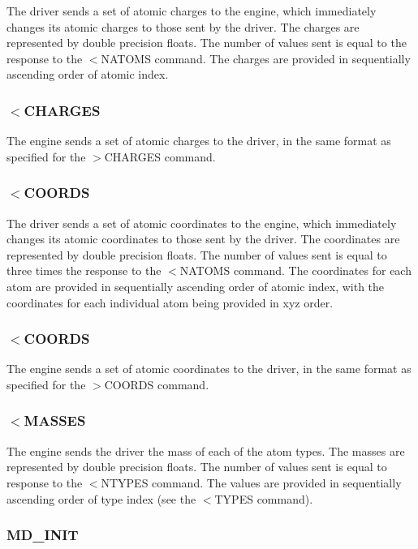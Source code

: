 The driver sends a set of atomic charges to the engine, which immediately changes its atomic charges to those sent by the driver. The charges are represented by double precision floats. The number of values sent is equal to the response to the $<$N\-A\-T\-O\-M\-S command. The charges are provided in sequentially ascending order of atomic index.\hypertarget{index_recv_charges}{}\subsubsection{$<$\-C\-H\-A\-R\-G\-E\-S}\label{index_recv_charges}
The engine sends a set of atomic charges to the driver, in the same format as specified for the {\ttfamily $>$C\-H\-A\-R\-G\-E\-S} command.\hypertarget{index_send_coords}{}\subsubsection{$<$\-C\-O\-O\-R\-D\-S}\label{index_send_coords}
The driver sends a set of atomic coordinates to the engine, which immediately changes its atomic coordinates to those sent by the driver. The coordinates are represented by double precision floats. The number of values sent is equal to three times the response to the $<$N\-A\-T\-O\-M\-S command. The coordinates for each atom are provided in sequentially ascending order of atomic index, with the coordinates for each individual atom being provided in xyz order.\hypertarget{index_send_coords}{}\subsubsection{$<$\-C\-O\-O\-R\-D\-S}\label{index_send_coords}
The engine sends a set of atomic coordinates to the driver, in the same format as specified for the {\ttfamily $>$C\-O\-O\-R\-D\-S} command.\hypertarget{index_recv_masses}{}\subsubsection{$<$\-M\-A\-S\-S\-E\-S}\label{index_recv_masses}
The engine sends the driver the mass of each of the atom types. The masses are represented by double precision floats. The number of values sent is equal to response to the $<$N\-T\-Y\-P\-E\-S command. The values are provided in sequentially ascending order of type index (see the {\ttfamily $<$T\-Y\-P\-E\-S} command).\hypertarget{index_md_init}{}\subsubsection{M\-D\-\_\-\-I\-N\-I\-T}\label{index_md_init}
